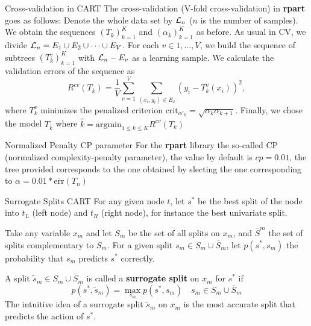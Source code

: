\documentclass{beamer}
\begin{document}
\begin{frame}{Cross-validation in CART}
	The cross-validation (V-fold cross-validation) in \textbf{rpart} goes as follows:
	Denote the whole data set by ${\cal L}_n$ ($n$ is the number of samples). We obtain the sequences $(T_k)_{k=1}^K$ and $(\alpha_k)_{k =1}^K$ as before.  
	As usual in CV, we divide ${\cal L}_n= E_1 \cup E_2 \cup \cdots \cup E_V$. For each $v \in 1,\ldots, V$, we build the sequence of subtrees $(T_k^v)_{k=1}^K$ with ${\cal L}_n - E_v$ as a learning sample. We calculate the validation errors of the sequence as
	\begin{equation*}
		R^{cv}(T_k)= \frac{1}{V} \sum_{v=1}^V \sum_{(x_i,y_i)\in E_v} (y_i - T_k^v(x_i))^2,
	\end{equation*}
	where $T_k^v$ minimizes the penalized criterion $\text{crit}_{\alpha'_k}= \sqrt{\alpha_k \alpha_{k+1}}$. 
	Finally, we chose the model $T_{\hat{k}}$ where $\hat{k}= \text{argmin}_{1\le k \le K}R^{cv}(T_k)$
\end{frame}

\begin{frame}{Normalized Penalty CP parameter}
	For the \textbf{rpart} library the so-called CP (normalized complexity-penalty parameter), the value by default is $cp=0.01$, the tree provided corresponds to the one obtained by slecting the one corresponding to $\alpha=0.01* \overline{\text{err}}(T_n)$
\end{frame}

\begin{frame}{Surrogate Splits CART}
	For any given node $t$, let $s^*$ be the best split of the node into $t_L$ (left node) and $t_R$ (right node), for instance the best univariate split.
	
	Take any variable $x_m$ and let $S_m$ be the set of all splits on $x_m$, and $\overline{S}^m$ the set of splits complementary to $S_m$.  For a given split $s_m\in S_m \cup \overline{S}_m$, let  $p(s^*,s_m)$ the probability that $s_m$ predicts $s^*$ correctly.
	
	A split $\tilde{s}_m   \in S_m \cup \overline{S}_m$ is called a \textbf{surrogate split} on $x_m$ for $s^*$ if 
	\begin{equation*}
		p(s^*,\tilde{s}_m)= \max_{s_m} p(s^*,s_m) \quad s_m \in S_m \cup \overline{S}_m
	\end{equation*}
	The intuitive idea of a surrogate split $\tilde{s}_m$ on $x_m$ is the most accurate split that predicts the action of $s^*$. 
\end{frame}
\end{document}
